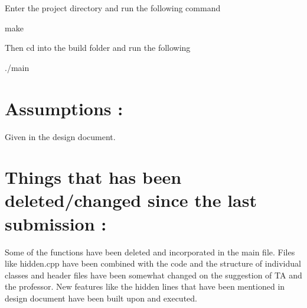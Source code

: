 Enter the project directory and run the following command 
\begin{DoxyCode}
make
\end{DoxyCode}
 Then cd into the build folder and run the following 
\begin{DoxyCode}
./main
\end{DoxyCode}


\section*{Assumptions \+:}

Given in the design document.

\section*{Things that has been deleted/changed since the last submission \+:}

Some of the functions have been deleted and incorporated in the main file. Files like hidden.\+cpp have been combined with the code and the structure of individual classes and header files have been somewhat changed on the suggestion of TA and the professor. New features like the hidden lines that have been mentioned in design document have been built upon and executed. 